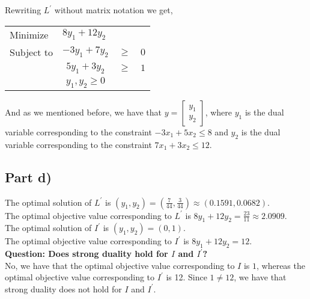 \documentclass[12pt]{article}
\begin{document}
\newpage

Rewriting $L^\prime$ without matrix notation we get,

\begin{center}
\begin{tabular}{ l c p{1pt} c }
Minimize    & \multicolumn{3}{l}{$8y_1 + 12y_2$} \\
Subject to  & $-3y_1 + 7y_2$ & $\geq$ & $0$ \\
            & $5y_1 + 3y_2$  & $\geq$ & $1$ \\
            & $y_1, y_2 \geq 0$
\end{tabular}
\end{center}

And as we mentioned before, we have that $y = \begin{bmatrix} y_1 \\ y_2 \end{bmatrix}$, where $y_1$ is the dual variable corresponding to the constraint $-3x_1 + 5x_2 \leq 8$ and $y_2$ is the dual variable corresponding to the constraint $7x_1 + 3x_2 \leq 12$. \\

\subsection*{Part d)}

The optimal solution of $L^\prime$ is $(y_1, y_2) = (\frac{7}{44}, \frac{3}{44}) \approx (0.1591, 0.0682)$. \\

The optimal objective value corresponding to $L^\prime$ is $8y_1 + 12y_2 = \frac{23}{11} \approx 2.0909$. \\

The optimal solution of $I^\prime$ is $(y_1, y_2) = (0,1)$. \\

The optimal objective value corresponding to $I^\prime$ is $8y_1 + 12y_2 = 12$. \\


\textbf{Question: Does strong duality hold for $I$ and $I^\prime$?} \\

No, we have that the optimal objective value corresponding to $I$ is $1$, whereas the optimal objective value corresponding to $I^\prime$ is 12. Since $1 \neq 12$, we have that strong duality does not hold for $I$ and $I^\prime$. 
\end{document}
